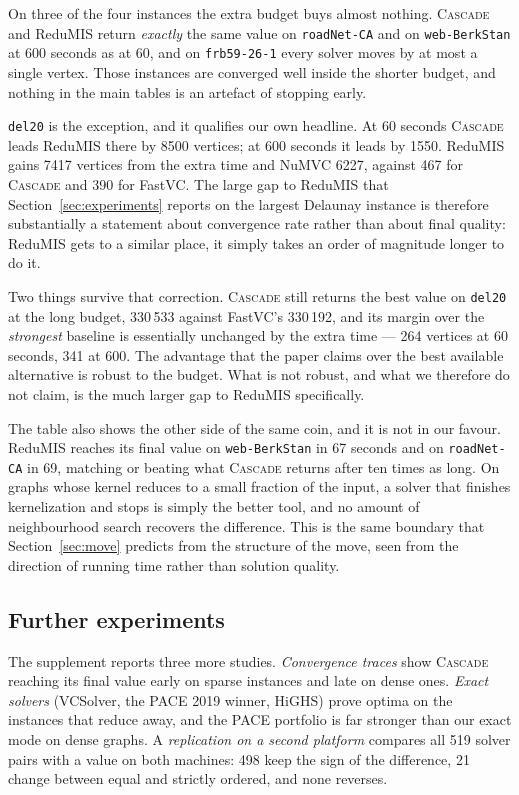 \documentclass[review,authoryear,11pt]{elsarticle}
\theoremstyle{definition}
\begin{document}
On three of the four instances the extra budget buys almost nothing.
\textsc{Cascade} and ReduMIS return \emph{exactly} the same value on
\texttt{roadNet-CA} and on \texttt{web-BerkStan} at 600 seconds as at 60, and on
\texttt{frb59-26-1} every solver moves by at most a single vertex. Those
instances are converged well inside the shorter budget, and nothing in the main
tables is an artefact of stopping early.

\texttt{del20} is the exception, and it qualifies our own headline. At 60
seconds \textsc{Cascade} leads ReduMIS there by 8500 vertices; at 600 seconds it
leads by 1550. ReduMIS gains 7417 vertices from the extra time and NuMVC 6227,
against 467 for \textsc{Cascade} and 390 for FastVC. The large gap to ReduMIS
that Section~\ref{sec:experiments} reports on the largest Delaunay instance is
therefore substantially a statement about convergence rate rather than about
final quality: ReduMIS gets to a similar place, it simply takes an order of
magnitude longer to do it.

Two things survive that correction. \textsc{Cascade} still returns the best value
on \texttt{del20} at the long budget, 330\,533 against FastVC's 330\,192, and its
margin over the \emph{strongest} baseline is essentially unchanged by the extra
time --- 264 vertices at 60 seconds, 341 at 600. The advantage that the paper
claims over the best available alternative is robust to the budget. What is not
robust, and what we therefore do not claim, is the much larger gap to ReduMIS
specifically.

The table also shows the other side of the same coin, and it is not in our
favour. ReduMIS reaches its final value on \texttt{web-BerkStan} in 67 seconds
and on \texttt{roadNet-CA} in 69, matching or beating what \textsc{Cascade}
returns after ten times as long. On graphs whose kernel reduces to a small
fraction of the input, a solver that finishes kernelization and stops is simply
the better tool, and no amount of neighbourhood search recovers the difference.
This is the same boundary that Section~\ref{sec:move} predicts from the
structure of the move, seen from the direction of running time rather than
solution quality.



\subsection{Further experiments}

The supplement reports three more studies. \emph{Convergence traces} show \textsc{Cascade}
reaching its final value early on sparse instances and late on dense ones. \emph{Exact solvers}
(VCSolver, the PACE 2019 winner, HiGHS) prove optima on the instances that reduce away, and
the PACE portfolio is far stronger than our exact mode on dense graphs. A \emph{replication on a
second platform} compares all 519 solver pairs with a value on both machines: 498 keep the sign
of the difference, 21 change between equal and strictly ordered, and none reverses.
\end{document}
